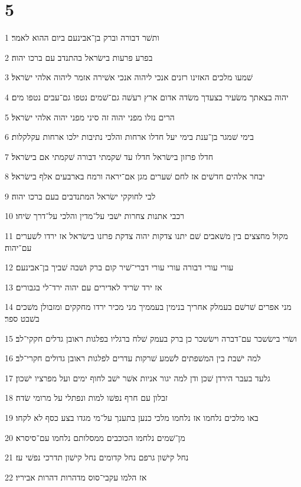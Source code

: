 \chapter{5}

\par 1 ותשׁר דבורה וברק בן־אבינעם ביום ההוא לאמר׃
\par 2 בפרע פרעות בישׂראל בהתנדב עם ברכו יהוה׃
\par 3 שׁמעו מלכים האזינו רזנים אנכי ליהוה אנכי אשׁירה אזמר ליהוה אלהי ישׂראל׃
\par 4 יהוה בצאתך משׂעיר בצעדך משׂדה אדום ארץ רעשׁה גם־שׁמים נטפו גם־עבים נטפו מים׃
\par 5 הרים נזלו מפני יהוה זה סיני מפני יהוה אלהי ישׂראל׃
\par 6 בימי שׁמגר בן־ענת בימי יעל חדלו ארחות והלכי נתיבות ילכו ארחות עקלקלות׃
\par 7 חדלו פרזון בישׂראל חדלו עד שׁקמתי דבורה שׁקמתי אם בישׂראל׃
\par 8 יבחר אלהים חדשׁים אז לחם שׁערים מגן אם־יראה ורמח בארבעים אלף בישׂראל׃
\par 9 לבי לחוקקי ישׂראל המתנדבים בעם ברכו יהוה׃
\par 10 רכבי אתנות צחרות ישׁבי על־מדין והלכי על־דרך שׂיחו׃
\par 11 מקול מחצצים בין משׁאבים שׁם יתנו צדקות יהוה צדקת פרזנו בישׂראל אז ירדו לשׁערים עם־יהוה׃
\par 12 עורי עורי דבורה עורי עורי דברי־שׁיר קום ברק ושׁבה שׁביך בן־אבינעם׃
\par 13 אז ירד שׂריד לאדירים עם יהוה ירד־לי בגבורים׃
\par 14 מני אפרים שׁרשׁם בעמלק אחריך בנימין בעממיך מני מכיר ירדו מחקקים ומזבולן משׁכים בשׁבט ספר׃
\par 15 ושׂרי בישׂשכר עם־דברה וישׂשכר כן ברק בעמק שׁלח ברגליו בפלגות ראובן גדלים חקקי־לב׃
\par 16 למה ישׁבת בין המשׁפתים לשׁמע שׁרקות עדרים לפלגות ראובן גדולים חקרי־לב׃
\par 17 גלעד בעבר הירדן שׁכן ודן למה יגור אניות אשׁר ישׁב לחוף ימים ועל מפרציו ישׁכון׃
\par 18 זבלון עם חרף נפשׁו למות ונפתלי על מרומי שׂדה׃
\par 19 באו מלכים נלחמו אז נלחמו מלכי כנען בתענך על־מי מגדו בצע כסף לא לקחו׃
\par 20 מן־שׁמים נלחמו הכוכבים ממסלותם נלחמו עם־סיסרא׃
\par 21 נחל קישׁון גרפם נחל קדומים נחל קישׁון תדרכי נפשׁי עז׃
\par 22 אז הלמו עקבי־סוס מדהרות דהרות אביריו׃
